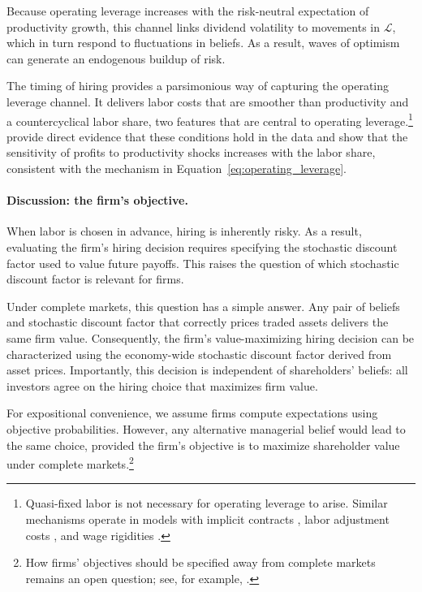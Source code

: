 Because operating leverage increases with the risk-neutral expectation of productivity
growth, this channel links dividend volatility to movements in $\mathcal L$, which in turn
respond to fluctuations in beliefs. As a result, waves of optimism can generate an
endogenous buildup of risk.

The timing of hiring provides a parsimonious way of capturing the operating leverage
channel. It delivers labor costs that are smoother than productivity and a
countercyclical labor share, two features that are central to operating leverage.\footnote{
Quasi-fixed labor is not necessary for operating leverage to arise. Similar mechanisms
operate in models with implicit contracts \citep{danthine2002labour}, labor adjustment
costs \citep{belo2014labor}, and wage rigidities \citep{favilukis2016does}.}
\citet{donangelo2019cross} provide direct evidence that these conditions hold in the data
and show that the sensitivity of profits to productivity shocks increases with the labor
share, consistent with the mechanism in
Equation~\eqref{eq:operating_leverage}.

\paragraph{Discussion: the firm's objective.}

When labor is chosen in advance, hiring is inherently risky. As a result, evaluating the
firm's hiring decision requires specifying the stochastic discount factor used to value
future payoffs. This raises the question of which stochastic discount factor is relevant
for firms.

Under complete markets, this question has a simple answer. Any pair of beliefs and
stochastic discount factor that correctly prices traded assets delivers the same firm
value. Consequently, the firm's value-maximizing hiring decision can be characterized
using the economy-wide stochastic discount factor derived from asset prices. Importantly,
this decision is independent of shareholders' beliefs: all investors agree on the hiring
choice that maximizes firm value.

For expositional convenience, we assume firms compute expectations
using objective probabilities. However, any alternative managerial belief would lead to
the same choice, provided the firm's objective is to maximize shareholder value
under complete markets.\footnote{How firms' objectives should be specified away from
complete markets remains an open question; see, for example,
\citet{geanakoplos1990generic}.}

